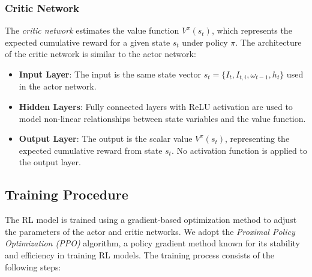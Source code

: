 \subsubsection{Critic Network}

The \textit{critic network} estimates the value function $V^\pi(s_t)$, which represents the expected cumulative reward for a given state $s_t$ under policy $\pi$. The architecture of the critic network is similar to the actor network:
\begin{itemize}
    \item \textbf{Input Layer}: The input is the same state vector $s_t = \{ I_t, I_{t,i}, \omega_{t-1}, h_t \}$ used in the actor network.
    \item \textbf{Hidden Layers}: Fully connected layers with ReLU activation are used to model non-linear relationships between state variables and the value function.
    \item \textbf{Output Layer}: The output is the scalar value $V^\pi(s_t)$, representing the expected cumulative reward from state $s_t$. No activation function is applied to the output layer.
\end{itemize}

\subsection{Training Procedure}

The RL model is trained using a gradient-based optimization method to adjust the parameters of the actor and critic networks. We adopt the \textit{Proximal Policy Optimization (PPO)} algorithm, a policy gradient method known for its stability and efficiency in training RL models. The training process consists of the following steps:

